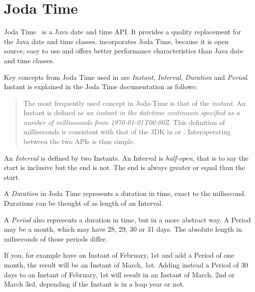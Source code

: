 \section{Joda Time}
Joda Time~\cite{jodatime} is a Java date and time API.
It provides a quality replacement for the Java date and time classes.
\salespoint{} incorporates Joda Time, because it is open source, easy to use and offers better performance characteristics than Java date and time classes.

Key concepts from Joda Time used in \salespoint{} are \textit{Instant}, \textit{Interval}, \textit{Duration} and \textit{Period}.
Instant is explained in the Joda Time documentation as follows:
\begin{quote}
The most frequently used concept in Joda-Time is that of the \textit{instant}.
An Instant is defined as \textit{an instant in the datetime continuum specified as a number of milliseconds from 1970-01-01T00:00Z}.
This definition of milliseconds is consistent with that of the JDK in  or .
Interoperating between the two APIs is thus simple.
\end{quote}

An \textit{Interval} is defined by two Instants.
An Interval is \textit{half-open}, that is to say the start is inclusive but the end is not.
The end is always greater or equal than the start.

A \textit{Duration} in Joda Time represents a duration in time, exact to the milisecond.
Durations can be thought of as length of an Interval.

A \textit{Period} also represents a duration in time, but in a more abstract way.
A Period may be a month, which may have 28, 29, 30 or 31 days. The absolute length in miliseconds of those periods differ.

If you, for example have an Instant of February, 1st and add a Period of one month, the result will be an Instant of March, 1st.
Adding instead a Period of 30 days to an Instant of February, 1st will result in an Instant of March, 2nd or March 3rd, depending if the Instant is in a leap year or not.
